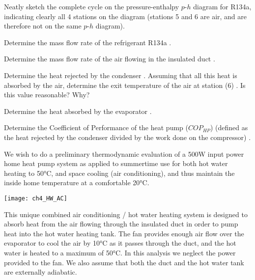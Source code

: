 \begin{homework}
  \begin{questionparts}
  \item Neatly sketch the complete cycle on the pressure-enthalpy $p$-$h$ diagram for R134a, indicating clearly all 4 stations on the diagram (stations 5 and 6 are air, and are therefore not on the same $p$-$h$ diagram).
  \item Determine the mass flow rate of the refrigerant R134a \answer{[0.0185kg/s]}.
  \item Determine the mass flow rate of the air flowing in the insulated duct \answer{[0.161kg/s]}.
  \item Determine the heat rejected by the condenser \answer{[3.7kW]}. Assuming that all this heat is absorbed by the air, determine the exit temperature of the air at station (6) \answer{[37.9°C]}. Is this value reasonable? Why?
  \item Determine the heat absorbed by the evaporator \answer{[2.7kW]}.
  \item Determine the Coefficient of Performance of the heat pump ($COP_{HP}$) (defined as the heat rejected by the condenser divided by the work done on the compressor) \answer{[3.7]}.
  \end{questionparts}

  \newpage
  \question We wish to do a preliminary thermodynamic evaluation of a 500W input power home heat pump system as applied to summertime use for both hot water heating to 50°C, and space cooling (air conditioning), and thus maintain the inside home temperature at a comfortable 20°C.

  \begin{center}
    \texttt{[image: ch4\_HW\_AC]}
  \end{center}

  This unique combined air conditioning / hot water heating system is designed to absorb heat from the air flowing through the insulated duct in order to pump heat into the hot water heating tank. The fan provides enough air flow over the evaporator to cool the air by 10°C as it passes through the duct, and the hot water is heated to a maximum of 50°C. In this analysis we neglect the power provided to the fan. We also assume that both the duct and the hot water tank are externally adiabatic.
  

\end{homework}
